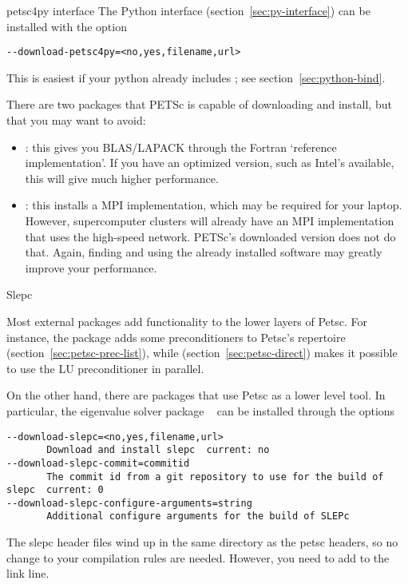 \begin{pythonnote}{petsc4py interface}
  The Python interface (section~\ref{sec:py-interface})
  can be installed with the option
\begin{verbatim}
--download-petsc4py=<no,yes,filename,url>
\end{verbatim}
This is easiest if your python already includes ;
see section~\ref{sec:python-bind}.
\end{pythonnote}

\begin{remark}
  There are two packages that PETSc is capable of downloading and install,
  but that you may want to avoid:
  \begin{itemize}
  \item {}: this gives you BLAS/LAPACK through the
    Fortran `reference implementation'. If you have an optimized
    version, such as Intel's  available, this will give
    much higher performance.
  \item {}: this installs a MPI implementation, which may be
    required for your laptop. However, supercomputer clusters will
    already have an MPI implementation that uses the high-speed
    network. PETSc's downloaded version does not do that. Again,
    finding and using the already installed software may greatly
    improve your performance.
  \end{itemize}
\end{remark}

 {Slepc}
\label{sec:petsc-slepc}

Most external packages add functionality to the lower layers of Petsc.
For instance, the  package
adds some preconditioners to Petsc's repertoire
(section~\ref{sec:petsc-prec-list}),
while 
(section~\ref{sec:petsc-direct})
makes it possible to use the LU
preconditioner in parallel.

On the other hand, there are packages
that use Petsc as a lower level tool.
In particular, the eigenvalue solver package ~\cite{slepc-homepage}
can be installed through the options
\begin{verbatim}
--download-slepc=<no,yes,filename,url>
       Download and install slepc  current: no
--download-slepc-commit=commitid
       The commit id from a git repository to use for the build of slepc  current: 0
--download-slepc-configure-arguments=string
       Additional configure arguments for the build of SLEPc
\end{verbatim}
The slepc header files wind up in the same directory as the petsc headers,
so no change to your compilation rules are needed.
However, you need to add  to the link line.
